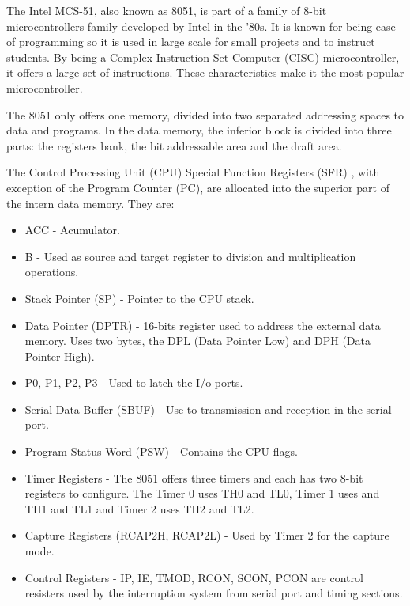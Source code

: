 \documentclass{report}
\begin{document}
		\par The Intel MCS-51, also known as 8051, is part of a family of 8-bit microcontrollers family developed by Intel in the '80s. It is known for being ease of programming so it is used in large scale for small projects and to instruct students. By being a Complex Instruction Set Computer (CISC) microcontroller, it offers a large set of instructions. These characteristics make it the most popular microcontroller.
		\par The 8051 only offers one memory, divided into two separated addressing spaces to data and programs. In the data memory, the inferior block is divided into three parts: the registers bank, the bit addressable area and the draft area.
		\par The Control Processing Unit (CPU) Special Function Registers (SFR) , with exception of the Program Counter (PC), are allocated into the superior part of the intern data memory.  They are:
		\begin{itemize}
			\item ACC - Acumulator.
			\item B - Used as source and target register to division and multiplication operations.
			\item Stack Pointer (SP) - Pointer to the CPU stack.
			\item Data Pointer (DPTR) - 16-bits register used to address the external data memory. Uses two bytes, the DPL (Data Pointer Low) and DPH (Data Pointer High).
			\item P0, P1, P2, P3 - Used to latch the I/o ports.
			\item Serial Data Buffer (SBUF) - Use to transmission and reception in the serial port.
			\item Program Status Word (PSW) - Contains the CPU flags.
			\item Timer Registers - The 8051 offers three timers and each has two 8-bit registers to configure. The Timer 0 uses TH0 and TL0, Timer 1 uses and TH1 and TL1 and Timer 2 uses TH2 and TL2.
			\item Capture Registers (RCAP2H, RCAP2L) - Used by Timer 2 for the capture mode.
			\item Control Registers - IP, IE, TMOD, RCON, SCON, PCON are control resisters used by the interruption system from serial port and timing sections. 
		\end{itemize}
		
\end{document}
